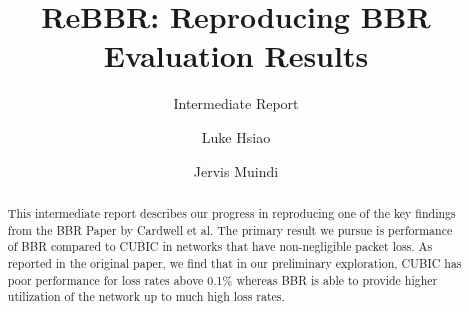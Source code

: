 \documentclass[sigconf]{acmart}
\begin{document}
\title{ReBBR: Reproducing BBR Evaluation Results}
\subtitle{Intermediate Report}

\author{Luke Hsiao}

\author{Jervis Muindi}


\begin{abstract}
This intermediate report describes our progress in reproducing one of the key
findings from the BBR Paper by Cardwell et al. The primary
result we pursue is performance of BBR compared to CUBIC in
networks that have non-negligible packet loss. As reported
in the original paper, we find that in our preliminary exploration,
CUBIC has poor performance for loss rates above 0.1\% whereas BBR is able
to provide higher utilization of the network up to much high loss rates.
\end{abstract}




\maketitle







\end{document}

